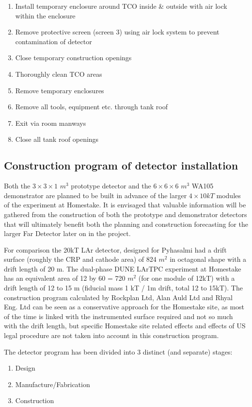 \begin{enumerate}
\item{Install temporary enclosure around TCO inside \& outside with air lock within the enclosure}
\item{ Remove protective screen (screen 3) using air lock system to prevent contamination of detector}
\item{Close temporary construction openings}
\item{Thoroughly clean TCO areas}
\item{Remove temporary enclosures}
\item{Remove all tools, equipment etc. through tank roof}
\item{Exit via room manways}
\item{Close all tank roof openings}
\end{enumerate}

\subsection{Construction program of detector installation}

Both the $3\times3\times1$ $m^3$ prototype detector and the $6\times 6\times 6$ $m^3$ WA105 demonstrator are planned to be built in advance
of the larger $4\times 10kT$ modules of the experiment at Homestake. It is envisaged that valuable information will be gathered from the
construction of both the prototype and demonstrator detectors that will ultimately benefit both the planning and construction forecasting
for the larger Far Detector later on in the project.

For comparison the 20kT LAr detector, designed for Pyhasalmi had a drift surface (roughly the CRP and cathode area) of 824 $m^2$ in
octagonal shape with a drift length of 20 m. The dual-phase DUNE LArTPC experiment at Homestake has an equivalent area of 12 by 60 = 720 $m^2$
(for one module of 12kT) with a drift length of 12 to 15 m (fiducial mass 1 kT / 1m drift, total 12 to 15kT). The construction program
calculated by Rockplan Ltd, Alan Auld Ltd and Rhyal Eng. Ltd can be seen as a conservative approach for the Homestake site, as most of the
time is linked with the instrumented surface required and not so much with the drift length, but specific Homestake site related effects and
effects of US legal procedure are not taken into account in this construction program.

The detector program has been divided into 3 distinct (and separate) stages:
\begin{enumerate}
\item{Design}
\item{Manufacture/Fabrication} 
\item{Construction}
\end{enumerate}  

